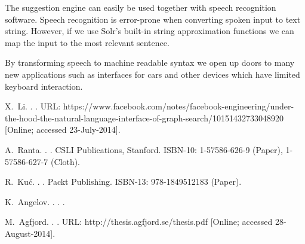 \documentclass[10pt, a4paper]{article}
\begin{document}
The suggestion engine can easily be used together with speech recognition software. Speech recognition is error-prone when converting spoken input to text string. However, if we use Solr's built-in string approximation functions we can map the input to the most relevant sentence.


By transforming speech to machine readable syntax we open up doors to many new applications such as interfaces for cars and other devices which have limited keyboard interaction.



\begin{thebibliography}{}

X.~Li.
.
.
\newblock URL: https://www.facebook.com/notes/facebook-engineering/under-the-hood-the-natural-language-interface-of-graph-search/10151432733048920 [Online; accessed 23-July-2014].

A.~Ranta.
.
.
\newblock CSLI Publications, Stanford.
\newblock ISBN-10: 1-57586-626-9 (Paper), 1-57586-627-7 (Cloth).

R.~Ku{\'{c}}.
.
.
\newblock Packt Publishing.
\newblock ISBN-13: 978-1849512183 (Paper).

K.~Angelov.
.
.
.

M.~Agfjord.
.
.
\newblock URL: http://thesis.agfjord.se/thesis.pdf [Online; accessed 28-August-2014].

\end{thebibliography}
\end{document}
